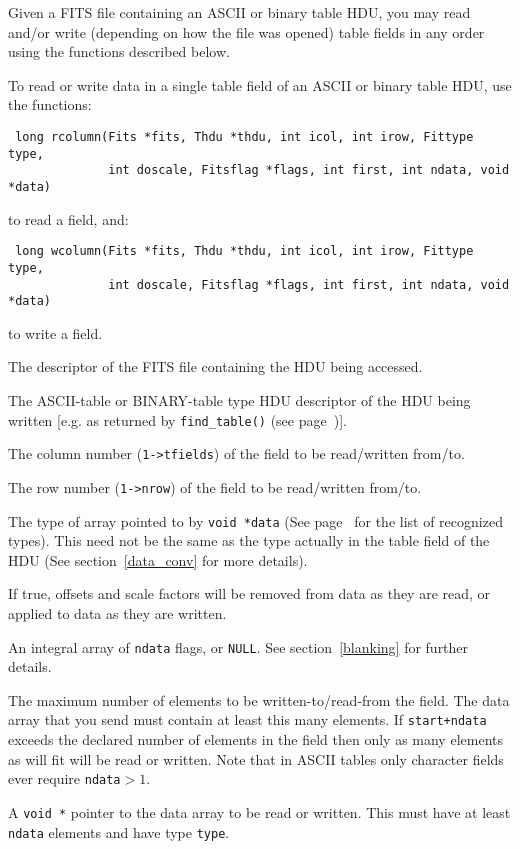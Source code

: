 Given a FITS file containing an ASCII or binary table HDU, you
may read and/or write (depending on how the file was opened) table
fields in any order using the functions described below.

To read or write data in a single table field of an ASCII or binary
table HDU, use the functions:
\label{rcolumn}\begin{verbatim}
 long rcolumn(Fits *fits, Thdu *thdu, int icol, int irow, Fittype type,
              int doscale, Fitsflag *flags, int first, int ndata, void *data)
\end{verbatim}
to read a field, and:
\label{wcolumn}\begin{verbatim}
 long wcolumn(Fits *fits, Thdu *thdu, int icol, int irow, Fittype type,
              int doscale, Fitsflag *flags, int first, int ndata, void *data)
\end{verbatim}
to write a field.
\begin{arglist}
 The descriptor of the FITS file containing the HDU being
             accessed.
 
 The ASCII-table or BINARY-table type HDU descriptor of
             the HDU being written [e.g. as returned by
             \verb`find_table()` (see page~\pageref{find_table})]. 

 The column number (\verb`1->tfields`) of the field to be
             read/written from/to.

 The row number (\verb`1->nrow`) of the field to be
             read/written from/to.

 The type of array pointed to by \verb`void *data`
             (See page~\pageref{Fittype} for the list of
             recognized types). This need not
             be the same as the type actually in the table field of
             the HDU (See section~\ref{data_conv} for more details).

 If true, offsets and scale factors will be removed from
             data as they are read, or applied to data as they are written.

 An integral array of \verb`ndata` flags, or \verb`NULL`. See
             section~\ref{blanking} for further details.

 The maximum number of elements to be written-to/read-from
             the field. The data array that you send must contain at
             least this many elements. If \verb`start+ndata` exceeds the
             declared number of elements in the field then only as
             many elements as will fit will be read or written.
             Note that in ASCII tables only character fields ever
             require \verb`ndata`$>1$.

 A \verb`void *` pointer to the data array to be
             read or written. This must have at least \verb`ndata`
             elements and have type \verb`type`.
\end{arglist}

